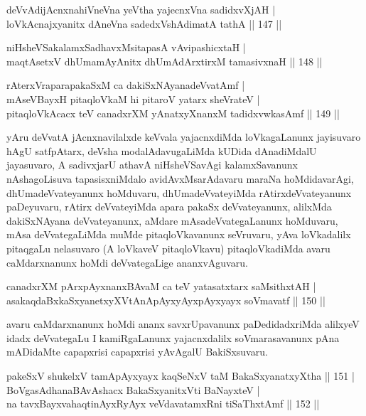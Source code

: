 \begin{shl}
deVvAdijAcnxnahiVneVna yeV\s tha yajecnxVna sadidxvXjAH | \\
loVkAcnajxyanitx dAneVna sadedxVshAdimatA tathA \hfill|| 147 || 
\end{shl}

\begin{shl}
niHsheVSakalamxSadhavxMsitapasA vA\s vipashicxtaH | \\
maqtAsetxV dhUmamAyAnitx dhUmAdArxtirxM tamasivxnaH \hfill|| 148 || 
\end{shl}

\begin{shl}
rAterxVraparapakaSxM ca dakiSxNAyanadeVvatAmf | \\
mAseVBayxH pitaqloVkaM hi pitaroV yatarx sheVrateV | \\
pitaqloVkAcacx teV canadxrXM yAnatxyXnanxM tadidxvwkasAmf \hfill|| 149 || 
\end{shl}

\begin{artha}
yAru deVvatA jAcnxnavilalxde keVvala yajacnxdiMda loVkagaLanunx
jayisuvaro hAgU satfpAtarx, deVsha modalAdavugaLiMda kUDida
dAnadiMdalU jayasuvaro, A sadivxjarU athavA niHsheVSavAgi
kalamxSavanunx nAshagoLisuva tapasisxniMdalo avidAvxMsarAdavaru maraNa
hoMdidavarAgi, dhUmadeVvateyanunx hoMduvaru, dhUmadeVvateyiMda
rAtirxdeVvateyanunx paDeyuvaru, rAtirx deVvateyiMda apara pakaSx
deVvateyanunx, alilxMda dakiSxNAyana deVvateyanunx, aMdare
mAsadeVvategaLanunx hoMduvaru, mAsa deVvategaLiMda muMde
pitaqloVkavanunx seVruvaru, yAva loVkadalilx pitaqgaLu nelasuvaro
(A loVkaveV pitaqloVkavu) pitaqloVkadiMda avaru caMdarxnanunx hoMdi
deVvategaLige ananxvAguvaru.
\end{artha}


\begin{shl}
canadxrXM pArxpAyxnanxBAvaM ca teV yatasatxtarx saMsithxtAH | \\
asakaqdaBxkaSxyanetxyXVtAnApAyxyAyx\s \s pAyxyayx soVmavatf \hfill|| 150 || 
\end{shl}

\begin{artha}
avaru caMdarxnanunx hoMdi ananx savxrUpavanunx paDedidadxriMda
alilxyeV idadx deVvategaLu I kamiRgaLanunx yajacnxdalilx
soVmarasavanunx pAna mADidaMte capapxrisi capapxrisi yAvAgalU
BakiSxsuvaru.
\end{artha}

\begin{shl}
pakeSxV shukelxV tamApAyxyayx kaqSeNxV taM BakaSxyanatxyXtha \hfill|| 151 | \\
BoVgasAdhanaBAvAshacx BakaSxyanitxVti BaNayxteV | \\
na tavxBayxvahaqtinAyxRyAyx veVdavatamxRni tiSaThxtAmf \hfill|| 152 || 
\end{shl}

